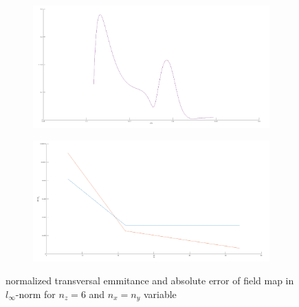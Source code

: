 \begin{center}
\begin{figure}[H]
   \begin{subfigure}{0.45\textwidth}
      \includegraphics[width=\textwidth]{fig/map_emit_xy}
   \end{subfigure}
   \begin{subfigure}{0.45\textwidth}
      \includegraphics[width=\textwidth]{fig/map_cvg_xy}
   \end{subfigure}
   \caption{normalized transversal emmitance and absolute error of field map in $l_\infty$-norm for $n_z=6$ and $n_x=n_y$ variable}
   \label{fig:map_cvg_xy}
\end{figure}
\end{center}

